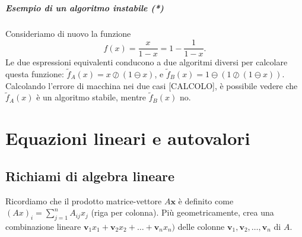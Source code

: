 \documentclass[a4paper]{report}
\theoremstyle{definiton}
\theoremstyle{remark}
\begin{document}
\paragraph{Esempio di un algoritmo instabile (*)}
Consideriamo di nuovo la funzione
\[
    f(x) = \frac{x}{1-x} = 1 - \frac{1}{1-x}.
\]
Le due espressioni equivalenti conducono a due algoritmi diversi per calcolare questa funzione: $\tilde{f}_A(x) = x \oslash (1 \ominus x)$, e $\tilde{f}_B(x) = 1 \ominus \left(1\oslash (1\ominus x)\right)$. Calcolando l'errore di macchina nei due casi [CALCOLO], è possibile vedere che $\tilde{f}_A(x)$ è un algoritmo stabile, mentre $\tilde{f}_B(x)$ no.

\chapter{Equazioni lineari e autovalori}

\section{Richiami di algebra lineare}

Ricordiamo che il prodotto matrice-vettore $A \mathbf{x}$ è definito come $(Ax)_i = \sum_{j=1}^n A_{ij}x_j$ (riga per colonna). Più geometricamente, crea una combinazione lineare $\mathbf{v}_1 x_1 + \mathbf{v}_2 x_2 + \dots + \mathbf{v}_n x_n)$ delle colonne $\mathbf{v}_1, \mathbf{v}_2, \dots, \mathbf{v}_n$ di $A$. 


\end{document}
